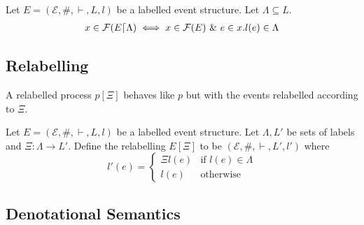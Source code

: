 \documentclass{article}
\begin{document}
\begin{proposition}

    Let $E = (\mathcal{E},\#,\vdash,L,l)$ be a labelled event structure.
    Let $\Lambda \subseteq L$.
    \begin{align*}
        x \in \mathcal{F}(E\lceil\Lambda) \iff x \in \mathcal{F}(E) \ \& \  e \in x.l(e) \in \Lambda
    \end{align*}

\end{proposition}

\subsection{Relabelling}

A relabelled process $p[\Xi]$ behaves like $p$ but with the events relabelled according to $\Xi$.

\begin{definition}

    Let $E = (\mathcal{E},\#,\vdash,L,l)$ be a labelled event structure.
    Let $\Lambda,L'$ be sets of labels and $\Xi: \Lambda \rightarrow L'$.
    Define the relabelling $E[\Xi]$ to be $(\mathcal{E},\#,\vdash,L',l')$ where
    $$
        l'(e) = \begin{cases}
            \Xi l(e) & \text{if } l(e) \in \Lambda \\
            l(e)     & \text{otherwise}
        \end{cases}
    $$

\end{definition}
\subsection{Denotational Semantics}
\end{document}
